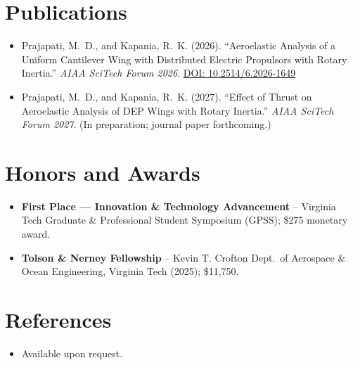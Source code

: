 \documentclass[11pt,a4paper]{moderncv}
\begin{document}

\section{Publications}
\vspace{1pt}
\begin{itemize}
\item Prajapati, M.~D., and Kapania, R.~K. (2026). ``Aeroelastic Analysis of a Uniform Cantilever Wing with Distributed Electric Propulsors with Rotary Inertia.'' \textit{AIAA SciTech Forum 2026}. \href{https://doi.org/10.2514/6.2026-1649}{DOI: 10.2514/6.2026-1649}
\item Prajapati, M.~D., and Kapania, R.~K. (2027). ``Effect of Thrust on Aeroelastic Analysis of DEP Wings with Rotary Inertia.'' \textit{AIAA SciTech Forum 2027}. (In preparation; journal paper forthcoming.)
\end{itemize}


\section{Honors and Awards}
\vspace{1pt}
\begin{itemize}
\item{\textbf{First Place --- Innovation \& Technology Advancement} -- Virginia Tech Graduate \& Professional Student Symposium (GPSS); \$275 monetary award.}
\item{\textbf{Tolson \& Nerney Fellowship} -- Kevin T. Crofton Dept.\ of Aerospace \& Ocean Engineering, Virginia Tech (2025); \$11,750.}
\end{itemize}


\section{References}
\vspace{1pt}
\begin{itemize}
\item{Available upon request.}
\end{itemize}
\end{document}

